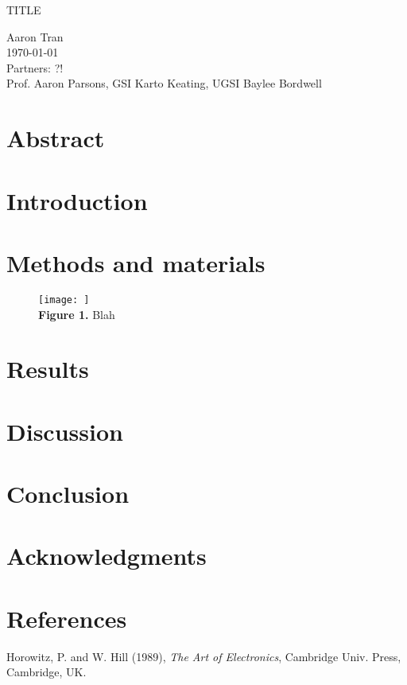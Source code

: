 \documentclass[11pt]{article}
\begin{document}
\begin{center}
\Large{TITLE}

\large
Aaron Tran \\
\today \\
Partners: ?! \\
Prof. Aaron Parsons, GSI Karto Keating, UGSI Baylee Bordwell
\end{center}

\section*{\sffamily Abstract}

\section{Introduction}

\section{Methods and materials}

\begin{figure}[h]
    \centering
    \texttt{[image: ]} \\
    \textbf{Figure 1.} Blah
\end{figure}

\section{Results}

\section{Discussion}

\section{Conclusion}

\section{Acknowledgments}

\section{References}

\ngindent 0.25in Horowitz, P. and W. Hill (1989), \emph{The Art of
Electronics}, Cambridge Univ. Press, Cambridge, UK.
\end{document}
